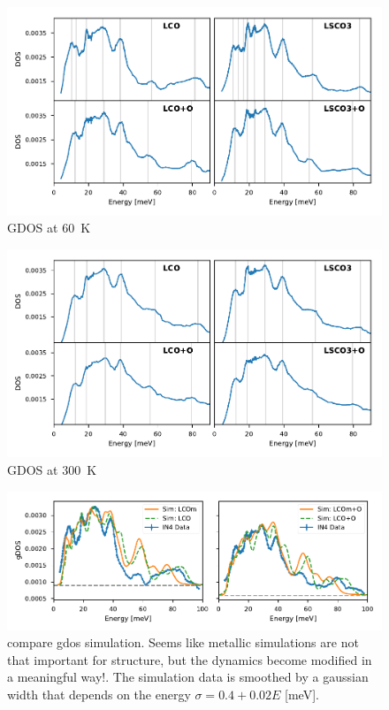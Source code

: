\begin{figure}
    \centering
    \includegraphics[width=\textwidth]{fig/gdos/in4_60K.pdf}
    \caption[gDOS at \SI{60}{\kelvin}]{GDOS at \SI{60}{\kelvin}}
    \label{fig:gdos_60k}
\end{figure}

\begin{figure}
    \centering
    \includegraphics[width=\textwidth]{fig/gdos/in4_300K.pdf}
    \caption[gDOS at \SI{300}{\kelvin}]{GDOS at \SI{300}{\kelvin}}
    \label{fig:gdos_300k}
\end{figure}

\begin{figure}[]
    \centering
    \includegraphics[width=\textwidth]{fig/gdos/gdos_simulation_experiment_compare.pdf}
    \caption[compare gdos simulation]{compare gdos simulation. Seems like metallic simulations are not that important for structure, but the dynamics become modified in a meaningful way!. The simulation data is smoothed by a gaussian width that depends on the energy $\sigma = 0.4 + 0.02 E$ [meV].}
    \label{fig:compare_gdos_sim}
\end{figure}